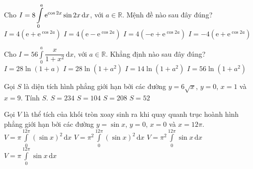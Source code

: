 \begin{ex}%
	Cho $I=8\displaystyle\displaystyle\int\limits_0^a \mathrm{e}^{\cos2x}\sin2x\mathrm{\,d}x$, với $a\in \mathbb{R}$. Mệnh đề nào sau đây đúng?
	\choice
	{$I=4\left(\mathrm{e}+\mathrm{e}^{\cos2a}\right) $}
	{\True $I=4\left(\mathrm{e}-\mathrm{e}^{\cos2a}\right) $}
	{$I=4\left(-\mathrm{e}+\mathrm{e}^{\cos2a}\right) $}
	{$I=-4\left(\mathrm{e}+\mathrm{e}^{\cos2a}\right) $}
\end{ex}

\begin{ex}%
	Cho $I=56\displaystyle\int\limits_0^a\dfrac{x}{1+x^2}\mathrm{\,d}x$, với $a\in\mathbb{R}$. Khẳng định nào sau đây đúng?
	\choice
	{$I=28\ln(1+a) $}
	{\True $I=28\ln(1+a^2) $}
	{$I=14\ln(1+a^2) $}
	{$I=56\ln(1+a^2) $}
\end{ex}

\begin{ex}%
	Gọi $S$ là diện tích hình phẳng giới hạn bởi các đường $y=6\sqrt{x}$, $y=0$, $x=1$ và $x=9$. Tính $S$.
	\choice
	{$S=234 $}
	{\True $S=104 $}
	{$S=208 $}
	{$S=52 $}
\end{ex}

\begin{ex}%
	Gọi $V$ là thể tích của khối tròn xoay sinh ra khi quay quanh trục hoành hình phẳng giới hạn bởi các đường $y=\sin x$, $y=0$, $x=0$ và $x=12\pi$.
	\choice
	{\True $V=\pi\displaystyle\int\limits_0^{12\pi}(\sin x)^2\mathrm{\,d}x $}
	{$V=\pi^2\displaystyle\int\limits_0^{12\pi}(\sin x)^2\mathrm{\,d}x $}
	{$V=\pi^2\displaystyle\int\limits_0^{12\pi}\sin x\mathrm{\,d}x $}
	{$V=\pi\displaystyle\int\limits_0^{12\pi}\sin x\mathrm{\,d}x $}
\end{ex}

